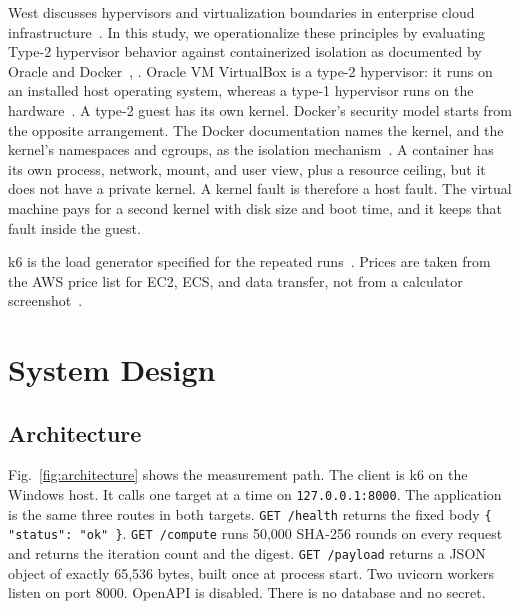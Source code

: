 \documentclass[conference,a4paper]{IEEEtran}
\begin{document}
West discusses hypervisors and virtualization boundaries in enterprise cloud infrastructure~\cite{b2}. In this study, we operationalize these principles by evaluating Type-2 hypervisor behavior against containerized isolation as documented by Oracle and Docker~\cite{b3}, \cite{b4}. Oracle VM VirtualBox is a type-2 hypervisor: it runs on an installed host operating system, whereas a type-1 hypervisor runs on the hardware~\cite{b3}. A type-2 guest has its own kernel. Docker's security model starts from the opposite arrangement. The Docker documentation names the kernel, and the kernel's namespaces and cgroups, as the isolation mechanism~\cite{b4}. A container has its own process, network, mount, and user view, plus a resource ceiling, but it does not have a private kernel. A kernel fault is therefore a host fault. The virtual machine pays for a second kernel with disk size and boot time, and it keeps that fault inside the guest.

k6 is the load generator specified for the repeated runs~\cite{b5}. Prices are taken from the AWS price list for EC2, ECS, and data transfer, not from a calculator screenshot~\cite{b6}.

\section{System Design}
\label{sec:design}

\subsection{Architecture}

Fig.~\ref{fig:architecture} shows the measurement path. The client is k6 on the Windows host. It calls one target at a time on \texttt{127.0.0.1:8000}. The application is the same three routes in both targets. \texttt{GET /health} returns the fixed body \texttt{\{ "status": "ok" \}}. \texttt{GET /compute} runs 50{,}000 SHA-256 rounds on every request and returns the iteration count and the digest. \texttt{GET /payload} returns a JSON object of exactly 65{,}536 bytes, built once at process start. Two uvicorn workers listen on port 8000. OpenAPI is disabled. There is no database and no secret.
\end{document}
